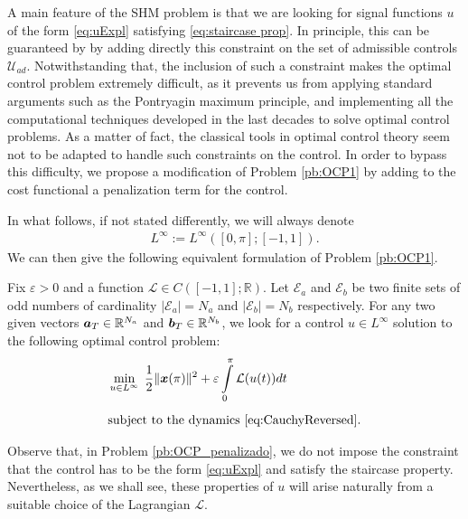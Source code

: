 \documentclass[twocolumn]{autart}    %
\begin{document}
A main feature of the SHM problem is that we are looking for signal functions $u$ of the form \eqref{eq:uExpl} satisfying \eqref{eq:staircase prop}. In principle, this can be guaranteed by by adding directly this constraint on the set of admissible controls $\mathcal{U}_{ad}$. Notwithstanding that, the inclusion of such a constraint makes the optimal control problem extremely difficult, as it prevents us from applying standard arguments such as the Pontryagin maximum principle, and implementing all the computational techniques developed in the last decades to solve optimal control problems. As a matter of fact, the classical tools in optimal control theory seem not to be adapted to handle such constraints on the control. In order to bypass this difficulty, we propose a modification of Problem \ref{pb:OCP1} by adding to the cost functional a penalization term for the control. 

In what follows, if not stated differently, we will always denote
\begin{align*}
	L^\infty:=L^\infty ([0,\pi]; [-1,1]).
\end{align*}
We can then give the following equivalent formulation of Problem \ref{pb:OCP1}.

\bigskip

\begin{problem}\label{pb:OCP_penalizado}
Fix $\varepsilon>0$ and a function $\mathcal{L}\in C([-1,1];\mathbb{R})$.  Let $\mathcal{E} _a $ and $\mathcal{E} _b $ be two finite sets of odd numbers of cardinality $|\mathcal{E}_a| = N_a $ and $ |\mathcal{E} _b| = N_b$ respectively. For any two given vectors $\bm{a}_T \in \mathbb{R}^{N_a}$ and $\bm{b}_T \in \mathbb{R}^{N_b} $, we look for a control $u\in L^\infty$ solution to the following optimal control problem:
\begin{align*}
	&\displaystyle\min_{u \in L^\infty}\;\dfrac{1}{2} \|\bm{x}(\pi)\|^2 + \varepsilon \displaystyle\int_0^\pi \mathcal{L}(u(t)) dt 
	\\[5pt] 
	&\text{subject to the dynamics \eqref{eq:CauchyReversed}}.
\end{align*}
\end{problem}

Observe that, in Problem \ref{pb:OCP_penalizado}, we do not impose the constraint that the control has to be the form \eqref{eq:uExpl} and satisfy the staircase property. Nevertheless, as we shall see, these properties of $u$ will arise naturally from a suitable choice of the Lagrangian $\mathcal{L}$.
\end{document}
